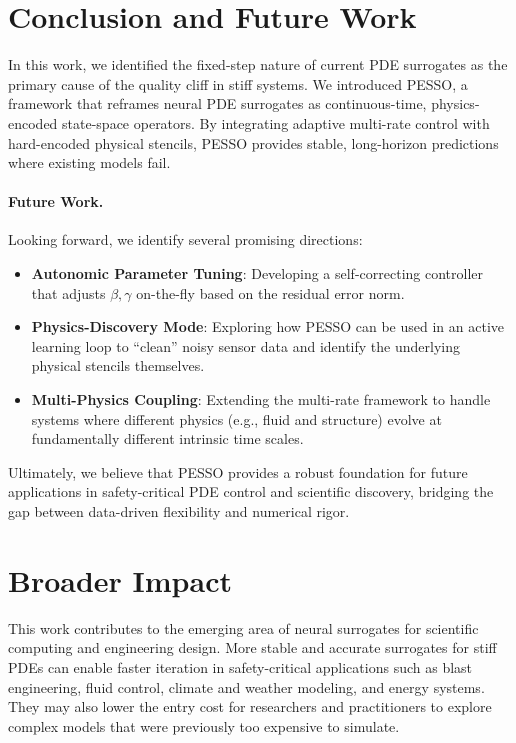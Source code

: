 \documentclass{article}
\theoremstyle{plain}
\theoremstyle{definition}
\theoremstyle{remark}
\begin{document}
\section{Conclusion and Future Work}
\label{sec:conclusion}

In this work, we identified the fixed-step nature of current PDE surrogates as the primary cause of the quality cliff in stiff systems. We introduced PESSO, a framework that reframes neural PDE surrogates as continuous-time, physics-encoded state-space operators. By integrating adaptive multi-rate control with hard-encoded physical stencils, PESSO provides stable, long-horizon predictions where existing models fail. 

\paragraph{Future Work.}
Looking forward, we identify several promising directions:
\begin{itemize}
    \item \textbf{Autonomic Parameter Tuning}: Developing a self-correcting controller that adjusts $\beta, \gamma$ on-the-fly based on the residual error norm.
    \item \textbf{Physics-Discovery Mode}: Exploring how PESSO can be used in an active learning loop to ``clean'' noisy sensor data and identify the underlying physical stencils themselves.
    \item \textbf{Multi-Physics Coupling}: Extending the multi-rate framework to handle systems where different physics (e.g., fluid and structure) evolve at fundamentally different intrinsic time scales.
\end{itemize}

Ultimately, we believe that PESSO provides a robust foundation for future applications in safety-critical PDE control and scientific discovery, bridging the gap between data-driven flexibility and numerical rigor.

\section*{Broader Impact}

This work contributes to the emerging area of neural surrogates for scientific computing and engineering design.
More stable and accurate surrogates for stiff PDEs can enable faster iteration in safety-critical applications such as blast engineering, fluid control, climate and weather modeling, and energy systems.
They may also lower the entry cost for researchers and practitioners to explore complex models that were previously too expensive to simulate.
\end{document}
